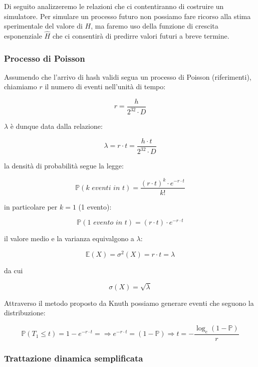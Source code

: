 \documentclass{article}
\begin{document}
Di seguito analizzeremo le relazioni che ci contentiranno di costruire un simulatore.
Per simulare un processo futuro non possiamo fare ricorso alla stima sperimentale del valore di $H$, 
ma faremo uso della funzione di crescita esponenziale $\hat{H}$ che ci consentirà di predirre valori futuri a breve termine.


\subsubsection{Processo di Poisson}

Assumendo che l'arrivo di hash validi segua un processo di Poisson (riferimenti), chiamiamo $r$ il numero di eventi nell'unità di tempo:

$$
r = \frac{h}{2^{32} \cdot D}
$$

$\lambda$ è dunque data dalla relazione:

\begin{equation}   
    \lambda = r \cdot t = \frac{h \cdot t}{2^{32} \cdot D}  \label{lambda_rate}
\end{equation}

la densità di probabilità segue la legge:

$$
    \mathbb{P}(\textit{k eventi in t}) = \frac{(r \cdot t)^{k} \cdot e^{-r \cdot t}}{k!}
$$

in particolare per $k = 1$ (1 evento):

\begin{equation}    
    \mathbb{P}(\textit{1 evento in t}) = (r \cdot t) \cdot e^{-r \cdot t}
\end{equation}


il valore medio e la varianza equivalgono a $\lambda$:

$$
    \mathbb{E}(X) = \sigma^{2}(X) = r \cdot t = \lambda
$$

da cui

$$
    \sigma(X) = \sqrt{\lambda} 
$$

Attraverso il metodo proposto da Knuth possiamo generare eventi che seguono la distribuzione:

$$
    \mathbb{P}(T_{1} \le t) = 1 - e^{-r \cdot t}  = \Rightarrow e^{-r \cdot t} = (1 - \mathbb{P}) \Rightarrow t = - \frac{\log_{e}(1 - \mathbb{P})}{r}
$$

\subsubsection{Trattazione dinamica semplificata}
\end{document}
